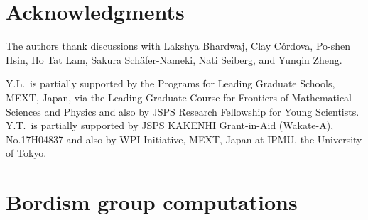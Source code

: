 \documentclass[12pt]{article}
\numberwithin{equation}{section}
\begin{document}
\section*{Acknowledgments}
The authors thank discussions with 
Lakshya Bhardwaj,
Clay C\'ordova,
Po-shen Hsin,
Ho Tat Lam,
Sakura Sch\"afer-Nameki,
Nati Seiberg,
and Yunqin Zheng.

Y.L.~is partially supported by the Programs for Leading Graduate Schools, MEXT, Japan, via the Leading Graduate Course for Frontiers of Mathematical Sciences and Physics
and also by JSPS Research Fellowship for Young Scientists.
Y.T.~is partially supported  by JSPS KAKENHI Grant-in-Aid (Wakate-A), No.17H04837 
and also by WPI Initiative, MEXT, Japan at IPMU, the University of Tokyo.


\appendix
\section{Bordism group computations}
\label{sec:bordism}
\end{document}
